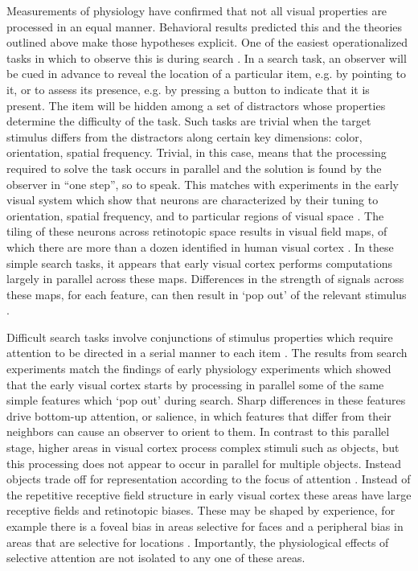 Measurements of physiology have confirmed that not all visual properties are processed in an equal manner. Behavioral results predicted this \citep{Li2002-ji,Moray1959-fn} and the theories outlined above make those hypotheses explicit. One of the easiest operationalized tasks in which to observe this is during search \citep{Wolfe1994-ew}. In a search task, an observer will be cued in advance to reveal the location of a particular item, e.g. by pointing to it, or to assess its presence, e.g. by pressing a button to indicate that it is present. The item will be hidden among a set of distractors whose properties determine the difficulty of the task. Such tasks are trivial when the target stimulus differs from the distractors along certain key dimensions: color, orientation, spatial frequency. Trivial, in this case, means that the processing required to solve the task occurs in parallel and the solution is found by the observer in “one step”, so to speak. This matches with experiments in the early visual system which show that neurons are characterized by their tuning to orientation, spatial frequency, and to particular regions of visual space \citep{Barlow1957-by,Hubel1962-pn}. The tiling of these neurons across retinotopic space results in visual field maps, of which there are more than a dozen identified in human visual cortex \citep{Wade2002-tt,Wandell2007-pr,Wandell2011-td}. In these simple search tasks, it appears that early visual cortex performs computations largely in parallel across these maps. Differences in the strength of signals across these maps, for each feature, can then result in ‘pop out’ of the relevant stimulus \citep{Nothdurft1993-xt,Treisman1985-dr}. 

Difficult search tasks involve conjunctions of stimulus properties \citep{Egeth1984-ch} which require attention to be directed in a serial manner to each item \citep{Treisman1980-gu}. The results from search experiments match the findings of early physiology experiments \citep{Hubel1959-fo,Hubel1968-na} which showed that the early visual cortex starts by processing in parallel some of the same simple features which `pop out' during search. Sharp differences in these features drive bottom-up attention, or salience, in which features that differ from their neighbors can cause an observer to orient to them. In contrast to this parallel stage, higher areas in visual cortex process complex stimuli such as objects, but this processing does not appear to occur in parallel for multiple objects. Instead objects trade off for representation according to the focus of attention \citep{Desimone1998-wf}. Instead of the repetitive receptive field structure in early visual cortex these areas have large receptive fields and retinotopic biases. These may be shaped by experience, for example there is a foveal bias in areas selective for faces and a peripheral bias in areas that are selective for locations \citep{Levy2001-oe}. Importantly, the physiological effects of selective attention are not isolated to any one of these areas. 

